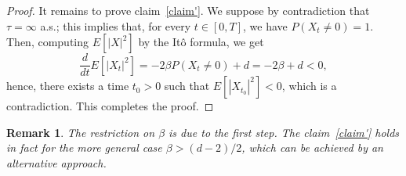 \documentclass[a4paper,10pt]{article}
\newtheorem{remark}[theorem]{Remark}
\newcommand\1{\mathbbm{1}}
\numberwithin{equation}{section}
\begin{document}
\begin{proof}
It remains to prove claim~\eqref{claim'}. We suppose by contradiction that $\tau=\infty$ a.s.; this implies that, for every $t \in [0,T]$, we have $P(X_t\neq0)=1$. Then, computing $E[|X|^2]$ by the It\^o formula, we get
\begin{equation*}
\frac{d}{dt}E[|X_t|^2]=-2\beta P(X_t\neq0)+d=-2\beta+d<0,
\end{equation*}
hence, there exists a time $t_0>0$ such that $E[|X_{t_0}|^2]<0$, which is a contradiction. This completes the proof.
\end{proof}

\begin{remark}
The restriction on $\beta$ is due to the first step. The claim~\eqref{claim'} holds in fact for the more general case $\beta>(d-2)/2$, which can be achieved by an alternative approach.
\end{remark}
\end{document}
